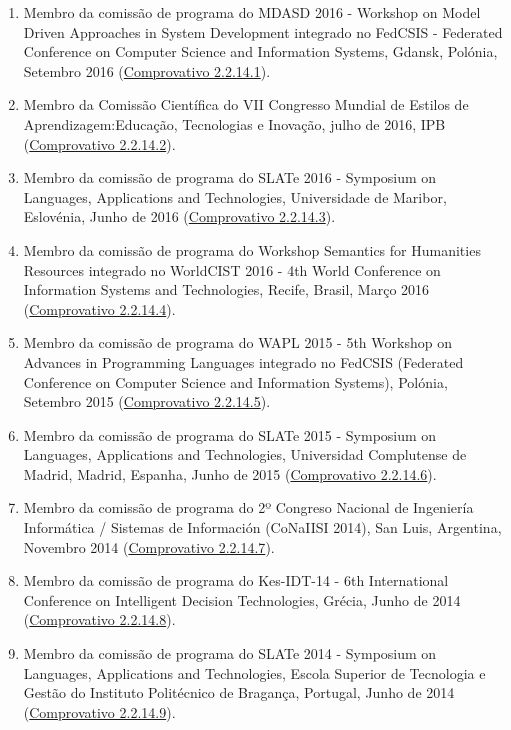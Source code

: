 \documentclass[11pt]{article}
\begin{document}
\begin{enumerate}
\item {Membro da comissão de programa do MDASD 2016 - Workshop on Model Driven Approaches in System Development integrado no FedCSIS - Federated Conference on Computer Science and Information Systems, Gdansk, Polónia, Setembro 2016 (\href{run:ComprovativosCOCP/CPMDASD2016.pdf}{Comprovativo 2.2.14.1}).}
\item {Membro da Comissão Científica do VII Congresso Mundial de Estilos de Aprendizagem:Educação, Tecnologias e Inovação, julho de 2016, IPB (\href{run:CongressoDocencia/ComissaoCientificaCMEA2016.pdf}{Comprovativo 2.2.14.2}).}
\item {Membro da comissão de programa do SLATe 2016 - Symposium on Languages, Applications and Technologies, Universidade de Maribor, Eslovénia, Junho de 2016 (\href{run:ComprovativosCOCP/CPSLATE2016.pdf}{Comprovativo 2.2.14.3}). }
\item {Membro da comissão de programa do Workshop Semantics for Humanities Resources integrado no WorldCIST 2016 - 4th World Conference on Information Systems and Technologies, Recife, Brasil, Março 2016 (\href{run:ComprovativosCOCP/WorldCist'16.pdf}{Comprovativo 2.2.14.4}). }
\item {Membro da comissão de programa do WAPL 2015 - 5th Workshop on Advances in Programming Languages integrado no FedCSIS (Federated Conference on Computer Science and Information Systems), Polónia, Setembro 2015 (\href{run:ComprovativosCOCP/CPWAPL2015.pdf}{Comprovativo 2.2.14.5}).}
\item {Membro da comissão de programa do SLATe 2015 - Symposium on Languages, Applications and Technologies, Universidad Complutense de Madrid, Madrid, Espanha, Junho de 2015 (\href{run:ComprovativosCOCP/CPSLATE2015.pdf}{Comprovativo 2.2.14.6}). }
\item {Membro da comissão de programa do 2º Congreso Nacional de Ingeniería Informática / Sistemas de Información (CoNaIISI 2014), San Luis, Argentina, Novembro 2014 (\href{run:ComprovativosCOCP/CPCoNaIISI2014.pdf}{Comprovativo 2.2.14.7}).}
\item {Membro da comissão de programa do Kes-IDT-14 - 6th International Conference on Intelligent Decision Technologies, Grécia, Junho de 2014 (\href{run:ComprovativosCOCP/CPKesIDT14.pdf}{Comprovativo 2.2.14.8}).}
\item {Membro da comissão de programa do SLATe 2014 - Symposium on Languages, Applications and Technologies, Escola Superior de Tecnologia e Gestão do Instituto Politécnico de Bragança, Portugal, Junho de 2014 (\href{run:ComprovativosCOCP/CPSLATE2014.pdf}{Comprovativo 2.2.14.9}).}

\end{enumerate}
\end{document}
